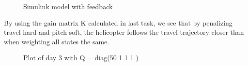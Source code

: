 \begin{figure}[htb]
	\centering
	\caption{Simulink model with feedback}
	\label{fig:day3_mdl}
\end{figure}

By using the gain matrix K calculated in last task, we see that by penalizing travel hard and pitch soft, the helicopter follows the travel trajectory closer than when weighting all states the same.
\begin{figure}[htb]
	\centering
	\caption{Plot of day 3 with Q = diag(50 1 1 1 )}
	\label{fig:day3_plot_50_1_1_1}
\end{figure}

